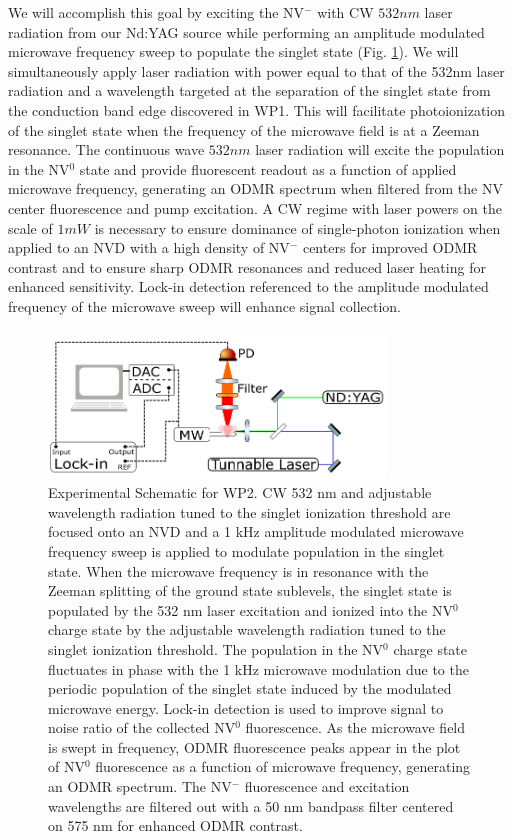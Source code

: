 We will accomplish this goal by exciting the NV$^-$ with CW $532\unit{nm}$ laser radiation from our
Nd:YAG source while performing an amplitude modulated microwave frequency sweep to populate the singlet
state (Fig. \ref{WP2Schematic}).  We will simultaneously apply laser radiation with power equal to that of the 532nm
laser radiation and a wavelength targeted at the separation of the singlet state from the conduction
band edge discovered in WP1.  This will facilitate photoionization of the singlet state when the
frequency of the microwave field is at a Zeeman resonance.  The continuous wave $532\unit{nm}$ laser radiation
will excite the population in the NV$^0$  state and provide fluorescent readout as a function of applied
microwave frequency, generating an ODMR spectrum when filtered from the NV center fluorescence and pump
excitation.  A CW regime with laser powers on the scale of $1\unit{mW}$ is necessary to ensure dominance of
single-photon ionization when applied to an NVD with a high density of NV$^-$ centers for improved ODMR contrast and to ensure sharp ODMR resonances and reduced
laser heating for enhanced sensitivity.  Lock-in detection referenced to the amplitude modulated
frequency of the microwave sweep will enhance signal collection.

\begin{figure}
\centering
\includegraphics[width=0.8\textwidth]{Figures/WP2Schematic.png}
\caption{Experimental Schematic for WP2. CW 532 nm and adjustable wavelength radiation tuned to the singlet ionization threshold are focused onto an NVD and a 1 kHz amplitude modulated microwave frequency sweep is applied to modulate population in the singlet state.  When the microwave frequency is in resonance with the Zeeman splitting of the ground state sublevels, the singlet state is populated by the 532 nm laser excitation and ionized into the NV$^0$ charge state by the adjustable wavelength radiation tuned to the singlet ionization threshold.  The population in the NV$^0$ charge state fluctuates in phase with the 1 kHz microwave modulation due to the periodic population of the singlet state induced by the modulated microwave energy.  Lock-in detection is used to improve signal to noise ratio of the collected NV$^0$ fluorescence.  As the microwave field is swept in frequency, ODMR fluorescence peaks appear in the plot of NV$^0$ fluorescence as a function of microwave frequency, generating an ODMR spectrum.  The NV$^-$ fluorescence and excitation wavelengths are filtered out with a 50 nm bandpass filter centered on 575 nm for enhanced ODMR contrast.}
\label{WP2Schematic}
\end{figure}


